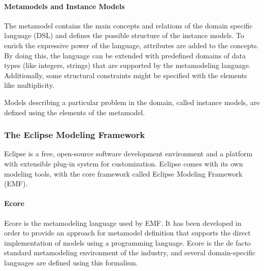 \paragraph{Metamodels and Instance Models}

The metamodel contains the main concepts and relations of the domain specific language (DSL) and defines the possible structure of the instance models. To enrich the expressive power of the language, attributes are added to the concepts. By doing this, the language can be extended with predefined domains of data types (like integers, strings) that are supported by the metamodeling language. Additionally, some structural constraints might be specified with the elements like multiplicity.

Models describing a particular problem in the domain, called instance models, are defined using the elements of the metamodel.

\subsubsection{The Eclipse Modeling Framework}
\label{sect:emf}
Eclipse is a free, open-source software development environment and a platform with extensible plug-in system for customization. Eclipse comes with its own modeling tools, with the core framework called Eclipse Modeling Framework (EMF).


\paragraph{Ecore}
Ecore is the metamodeling language used by EMF. It has been developed in order to provide an approach for metamodel definition that supports the direct implementation of models using a programming language. Ecore is the de facto standard metamodeling environment of the industry, and several domain-specific languages are defined using this formalism.~\cite{scm}

